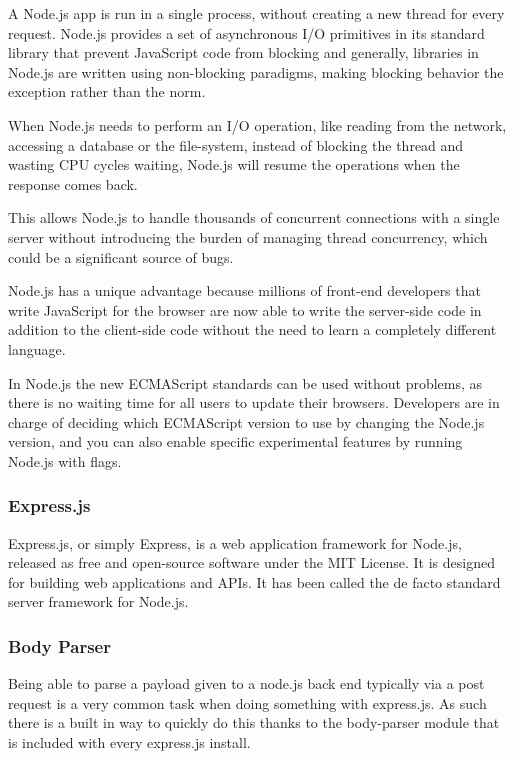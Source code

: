 \documentclass[12pt]{article}
\begin{document}
A Node.js app is run in a single process, without creating a new thread for every request. Node.js provides a set of asynchronous I/O primitives in its standard library that prevent JavaScript code from blocking and generally, libraries in Node.js are written using non-blocking paradigms, making blocking behavior the exception rather than the norm.

When Node.js needs to perform an I/O operation, like reading from the network, accessing a database or the file-system, instead of blocking the thread and wasting CPU cycles waiting, Node.js will resume the operations when the response comes back.

This allows Node.js to handle thousands of concurrent connections with a single server without introducing the burden of managing thread concurrency, which could be a significant source of bugs.

Node.js has a unique advantage because millions of front-end developers that write JavaScript for the browser are now able to write the server-side code in addition to the client-side code without the need to learn a completely different language.

In Node.js the new ECMAScript standards can be used without problems, as there is no waiting time for all users to update their browsers. Developers are in charge of deciding which ECMAScript version to use by changing the Node.js version, and you can also enable specific experimental features by running Node.js with flags.\cite{nodejs}

\subsubsection{Express.js}
Express.js, or simply Express, is a web application framework for Node.js, released as free and open-source software under the MIT License. It is designed for building web applications and APIs. It has been called the de facto standard server framework for Node.js.\cite{expressjs}

\subsubsection{Body Parser}
Being able to parse a payload given to a node.js back end typically via a post request is a very common task when doing something with express.js. As such there is a built in way to quickly do this thanks to the body-parser module that is included with every express.js install.\cite{bodyparser}
\end{document}
